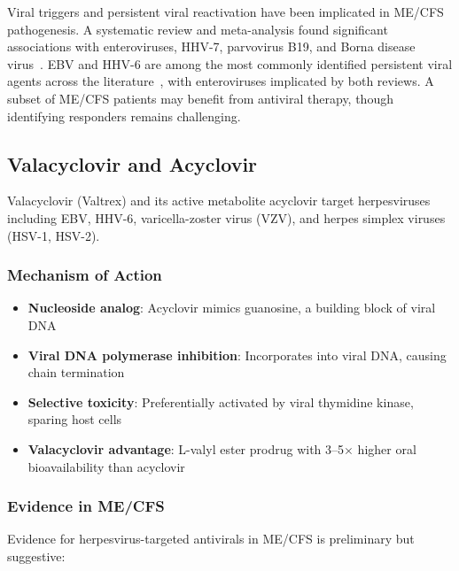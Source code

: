 Viral triggers and persistent viral reactivation have been implicated in ME/CFS pathogenesis. A systematic review and meta-analysis found significant associations with enteroviruses, HHV-7, parvovirus B19, and Borna disease virus~\cite{hwang2023viral}. EBV and HHV-6 are among the most commonly identified persistent viral agents across the literature~\cite{Rasa2018}, with enteroviruses implicated by both reviews. A subset of ME/CFS patients may benefit from antiviral therapy, though identifying responders remains challenging.

\subsection{Valacyclovir and Acyclovir}

Valacyclovir (Valtrex) and its active metabolite acyclovir target herpesviruses including EBV, HHV-6, varicella-zoster virus (VZV), and herpes simplex viruses (HSV-1, HSV-2).

\subsubsection{Mechanism of Action}

\begin{itemize}
    \item \textbf{Nucleoside analog}: Acyclovir mimics guanosine, a building block of viral DNA
    \item \textbf{Viral DNA polymerase inhibition}: Incorporates into viral DNA, causing chain termination
    \item \textbf{Selective toxicity}: Preferentially activated by viral thymidine kinase, sparing host cells
    \item \textbf{Valacyclovir advantage}: L-valyl ester prodrug with 3--5$\times$ higher oral bioavailability than acyclovir
\end{itemize}

\subsubsection{Evidence in ME/CFS}

Evidence for herpesvirus-targeted antivirals in ME/CFS is preliminary but suggestive:

